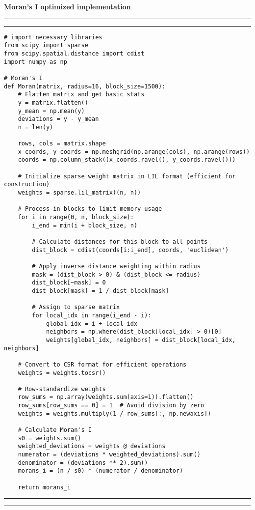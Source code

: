 \textbf{\large{Moran's I optimized implementation}}
\vspace{2.5pt}
\hrule
\vspace{1mm}
\hrule
\begin{lstlisting}
# import necessary libraries
from scipy import sparse
from scipy.spatial.distance import cdist
import numpy as np

# Moran's I
def Moran(matrix, radius=16, block_size=1500):
    # Flatten matrix and get basic stats
    y = matrix.flatten()
    y_mean = np.mean(y)
    deviations = y - y_mean
    n = len(y)

    rows, cols = matrix.shape
    x_coords, y_coords = np.meshgrid(np.arange(cols), np.arange(rows))
    coords = np.column_stack((x_coords.ravel(), y_coords.ravel()))

    # Initialize sparse weight matrix in LIL format (efficient for construction)
    weights = sparse.lil_matrix((n, n))

    # Process in blocks to limit memory usage
    for i in range(0, n, block_size):
        i_end = min(i + block_size, n)

        # Calculate distances for this block to all points
        dist_block = cdist(coords[i:i_end], coords, 'euclidean')

        # Apply inverse distance weighting within radius
        mask = (dist_block > 0) & (dist_block <= radius)
        dist_block[~mask] = 0
        dist_block[mask] = 1 / dist_block[mask]

        # Assign to sparse matrix
        for local_idx in range(i_end - i):
            global_idx = i + local_idx
            neighbors = np.where(dist_block[local_idx] > 0)[0]
            weights[global_idx, neighbors] = dist_block[local_idx, neighbors]

    # Convert to CSR format for efficient operations
    weights = weights.tocsr()

    # Row-standardize weights
    row_sums = np.array(weights.sum(axis=1)).flatten()
    row_sums[row_sums == 0] = 1  # Avoid division by zero
    weights = weights.multiply(1 / row_sums[:, np.newaxis])

    # Calculate Moran's I
    s0 = weights.sum()
    weighted_deviations = weights @ deviations
    numerator = (deviations * weighted_deviations).sum()
    denominator = (deviations ** 2).sum()
    morans_i = (n / s0) * (numerator / denominator)

    return morans_i
\end{lstlisting}
\hrule
\vspace{1mm}
\hrule
\vspace{5mm}

